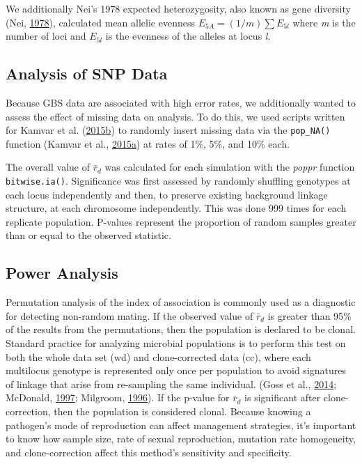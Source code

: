 \documentclass[double,12pt]{beavtex}
\begin{document}
  We additionally Nei's 1978 expected heterozygosity, also known as gene
  diversity (Nei, \protect\hyperlink{ref-Nei:1978}{1978}), calculated mean
  allelic evenness \(E_{5A} = (1/m) \sum E_{5l}\) where \emph{m} is the
  number of loci and \(E_{5l}\) is the evenness of the alleles at locus
  \emph{l}.
  
  \subsection{Analysis of SNP Data}\label{analysis-of-snp-data}
  
  Because GBS data are associated with high error rates, we additionally
  wanted to assess the effect of missing data on analysis. To do this, we
  used scripts written for Kamvar et al.
  (\protect\hyperlink{ref-kamvar2015novel}{2015}\protect\hyperlink{ref-kamvar2015novel}{b})
  to randomly insert missing data via the \texttt{pop\_NA()} function
  (Kamvar et al.,
  \protect\hyperlink{ref-kamvar2015poppr2supp}{2015}\protect\hyperlink{ref-kamvar2015poppr2supp}{a})
  at rates of 1\%, 5\%, and 10\% each.
  
  The overall value of \(\bar{r}_d\) was calculated for each simulation
  with the \emph{poppr} function \texttt{bitwise.ia()}. Significance was
  first assessed by randomly shuffling genotypes at each locus
  independently and then, to preserve existing background linkage
  structure, at each chromosome independently. This was done 999 times for
  each replicate population. P-values represent the proportion of random
  samples greater than or equal to the observed statistic.
  
  \subsection{Power Analysis}\label{power-analysis}
  
  Permutation analysis of the index of association is commonly used as a
  diagnostic for detecting non-random mating. If the observed value of
  \(\bar{r}_d\) is greater than 95\% of the results from the permutations,
  then the population is declared to be clonal. Standard practice for
  analyzing microbial populations is to perform this test on both the
  whole data set (wd) and clone-corrected data (cc), where each multilocus
  genotype is represented only once per population to avoid signatures of
  linkage that arise from re-sampling the same individual. (Goss et al.,
  \protect\hyperlink{ref-goss2014irish}{2014}; McDonald,
  \protect\hyperlink{ref-mcdonald1997population}{1997}; Milgroom,
  \protect\hyperlink{ref-milgroom1996recombination}{1996}). If the p-value
  for \(\bar{r}_d\) is significant after clone-correction, then the
  population is considered clonal. Because knowing a pathogen's mode of
  reproduction can affect management strategies, it's important to know
  how sample size, rate of sexual reproduction, mutation rate homogeneity,
  and clone-correction affect this method's sensitivity and specificity.
  
\end{document}
